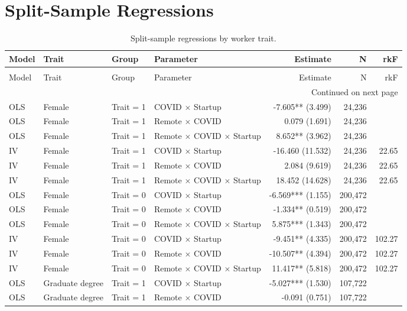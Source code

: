 \documentclass[11pt]{article}
\begin{document}
\section*{Split-Sample Regressions}
{\small
\begin{longtable}{llllrrr}
\caption{Split-sample regressions by worker trait.} \label{tab:traits-split} \\
\toprule
Model & Trait & Group & Parameter & Estimate & N & rkF \\
\midrule
\endfirsthead
\caption[]{Split-sample regressions by worker trait.} \\
\toprule
Model & Trait & Group & Parameter & Estimate & N & rkF \\
\midrule
\endhead
\midrule
\multicolumn{7}{r}{Continued on next page} \\
\midrule
\endfoot
\bottomrule
\endlastfoot
OLS & Female & Trait = 1 & COVID $\times$ Startup & -7.605** (3.499) & 24,236 &  \\
OLS & Female & Trait = 1 & Remote $\times$ COVID &  0.079 (1.691) & 24,236 &  \\
OLS & Female & Trait = 1 & Remote $\times$ COVID $\times$ Startup &  8.652** (3.962) & 24,236 &  \\
IV & Female & Trait = 1 & COVID $\times$ Startup & -16.460 (11.532) & 24,236 & 22.65 \\
IV & Female & Trait = 1 & Remote $\times$ COVID &  2.084 (9.619) & 24,236 & 22.65 \\
IV & Female & Trait = 1 & Remote $\times$ COVID $\times$ Startup &  18.452 (14.628) & 24,236 & 22.65 \\
OLS & Female & Trait = 0 & COVID $\times$ Startup & -6.569*** (1.155) & 200,472 &  \\
OLS & Female & Trait = 0 & Remote $\times$ COVID & -1.334** (0.519) & 200,472 &  \\
OLS & Female & Trait = 0 & Remote $\times$ COVID $\times$ Startup &  5.875*** (1.343) & 200,472 &  \\
IV & Female & Trait = 0 & COVID $\times$ Startup & -9.451** (4.335) & 200,472 & 102.27 \\
IV & Female & Trait = 0 & Remote $\times$ COVID & -10.507** (4.394) & 200,472 & 102.27 \\
IV & Female & Trait = 0 & Remote $\times$ COVID $\times$ Startup &  11.417** (5.818) & 200,472 & 102.27 \\
OLS & Graduate degree & Trait = 1 & COVID $\times$ Startup & -5.027*** (1.530) & 107,722 &  \\
OLS & Graduate degree & Trait = 1 & Remote $\times$ COVID & -0.091 (0.751) & 107,722 &  \\

\end{longtable}}
\end{document}
